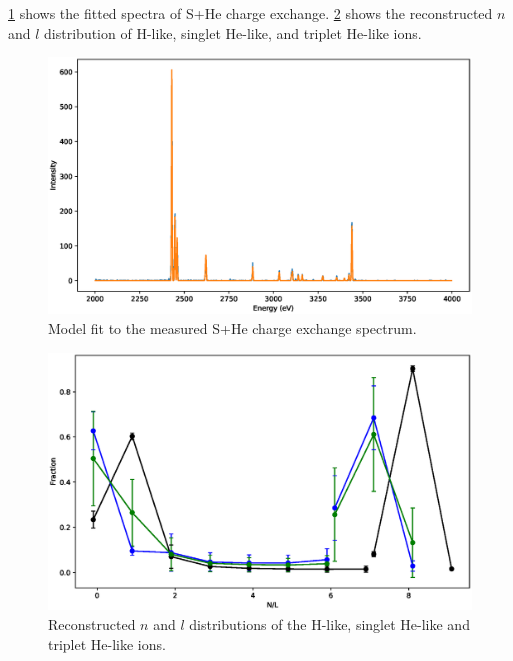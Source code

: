\documentclass{aastex}
\begin{document}
\ref{fig:s+he.spec} shows the fitted spectra of S+He charge
exchange. \ref{fig:s+he.nldist} shows the reconstructed $n$ and $l$
distribution of H-like, singlet He-like, and triplet He-like ions.
\begin{figure}
  \includegraphics[width=5in]{spec_s_he.eps}
  \caption{\label{fig:s+he.spec}Model fit to the measured S+He charge exchange
    spectrum.}
\end{figure}

\begin{figure}
  \includegraphics[width=5in]{nl_s_he.eps}
  \caption{\label{fig:s+he.nldist}Reconstructed $n$ and $l$ distributions of the
    H-like, singlet He-like and triplet He-like ions.}
\end{figure}
\end{document}
